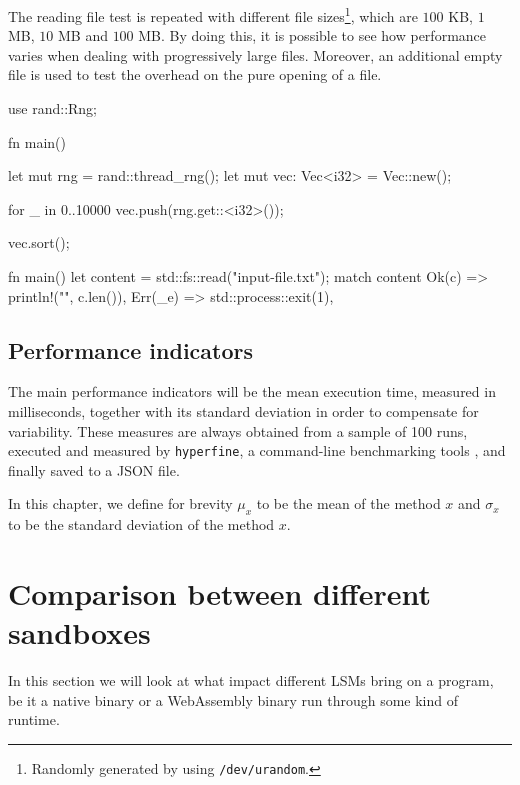 The reading file test is repeated with different file sizes\footnote{Randomly generated by using \texttt{/dev/urandom}.},
which are $100$ KB, $1$ MB, $10$ MB and $100$ MB. By doing this, it is possible to see how performance
varies when dealing with progressively large files. Moreover, an additional empty file is used to
test the overhead on the pure opening of a file.

\vspace*{0.5cm}
\begin{code}[language=Rust, caption=The tested ``sorting program''., label=lst:sorting-test-rust]
use rand::Rng;

fn main() {
  let mut rng = rand::thread_rng();
  let mut vec: Vec<i32> = Vec::new();

  for _ in 0..10000 {
    vec.push(rng.get::<i32>());
  }

  vec.sort();
}
\end{code}

\begin{code}[language=Rust, caption=The tested ``reading program''., label=lst:reading-test-rust]
fn main() {
  let content = std::fs::read("input-file.txt");
  match content {
      Ok(c) => println!("{}", c.len()),
      Err(_e) => std::process::exit(1),
  }
}
\end{code}

\subsection{Performance indicators}

The main performance indicators will be the mean execution time, measured in milliseconds, together with its
standard deviation in order to compensate for variability.
These measures are always obtained from a sample of 100 runs, executed and measured by \texttt{hyperfine},
a command-line benchmarking tools \cite{hyperfine}, and finally saved to a
JSON file.

In this chapter, we define for brevity $\mu_x$ to be the mean of the method $x$ and $\sigma_x$ to be
the standard deviation of the method $x$.

\section{Comparison between different sandboxes}

In this section we will look at what impact different LSMs bring on a program,
be it a native binary or a WebAssembly binary run through some kind of runtime.

